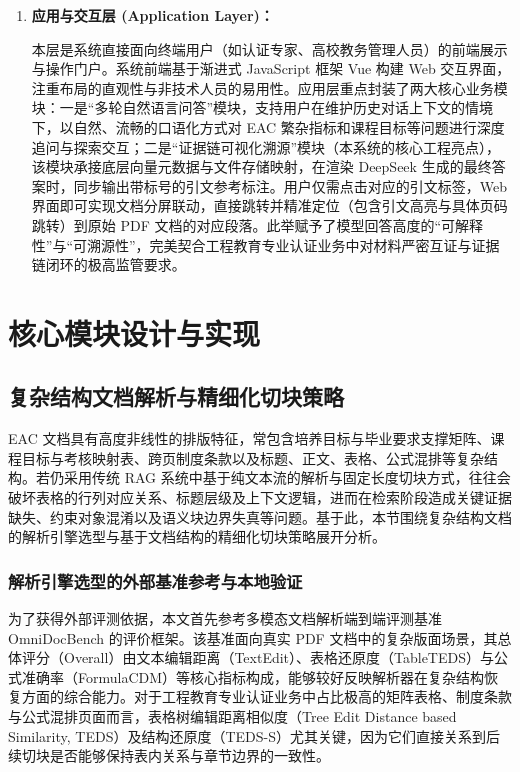 \documentclass[UTF8,a4paper,zihao=-4]{ctexart}
\begin{document}
\begin{enumerate}
        \item \textbf{应用与交互层 (Application Layer)：}
        
        本层是系统直接面向终端用户（如认证专家、高校教务管理人员）的前端展示与操作门户。系统前端基于渐进式 JavaScript 框架 Vue 构建 Web 交互界面，注重布局的直观性与非技术人员的易用性。应用层重点封装了两大核心业务模块：一是“多轮自然语言问答”模块，支持用户在维护历史对话上下文的情境下，以自然、流畅的口语化方式对 EAC 繁杂指标和课程目标等问题进行深度追问与探索交互；二是“证据链可视化溯源”模块（本系统的核心工程亮点），该模块承接底层向量元数据与文件存储映射，在渲染 DeepSeek 生成的最终答案时，同步输出带标号的引文参考标注。用户仅需点击对应的引文标签，Web 界面即可实现文档分屏联动，直接跳转并精准定位（包含引文高亮与具体页码跳转）到原始 PDF 文档的对应段落。此举赋予了模型回答高度的“可解释性”与“可溯源性”，完美契合工程教育专业认证业务中对材料严密互证与证据链闭环的极高监管要求。
        
    \end{enumerate}

\section{核心模块设计与实现}

\subsection{复杂结构文档解析与精细化切块策略}
EAC 文档具有高度非线性的排版特征，常包含培养目标与毕业要求支撑矩阵、课程目标与考核映射表、跨页制度条款以及标题、正文、表格、公式混排等复杂结构。若仍采用传统 RAG 系统中基于纯文本流的解析与固定长度切块方式，往往会破坏表格的行列对应关系、标题层级及上下文逻辑，进而在检索阶段造成关键证据缺失、约束对象混淆以及语义块边界失真等问题。基于此，本节围绕复杂结构文档的解析引擎选型与基于文档结构的精细化切块策略展开分析。

\subsubsection{解析引擎选型的外部基准参考与本地验证}

为了获得外部评测依据，本文首先参考多模态文档解析端到端评测基准 OmniDocBench 的评价框架。该基准面向真实 PDF 文档中的复杂版面场景，其总体评分（Overall）由文本编辑距离（TextEdit）、表格还原度（TableTEDS）与公式准确率（FormulaCDM）等核心指标构成，能够较好反映解析器在复杂结构恢复方面的综合能力。对于工程教育专业认证业务中占比极高的矩阵表格、制度条款与公式混排页面而言，表格树编辑距离相似度（Tree Edit Distance based Similarity, TEDS）及结构还原度（TEDS-S）尤其关键，因为它们直接关系到后续切块是否能够保持表内关系与章节边界的一致性。
\end{document}
